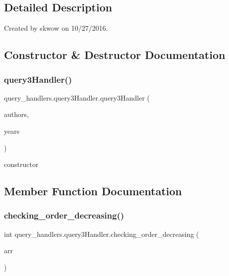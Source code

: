 \subsection{Detailed Description}
Created by skwow on 10/27/2016. 

\subsection{Constructor \& Destructor Documentation}
\hypertarget{classquery__handlers_1_1query3_handler_a211f4f1f6cab6c6f5e8b6d94efea78d7}{}\label{classquery__handlers_1_1query3_handler_a211f4f1f6cab6c6f5e8b6d94efea78d7} 
\subsubsection{\texorpdfstring{query3\+Handler()}{query3Handler()}}
{\footnotesize\ttfamily query\+\_\+handlers.\+query3\+Handler.\+query3\+Handler (\begin{DoxyParamCaption}\item[{String \mbox{[}$\,$\mbox{]}}]{authors,  }\item[{int \mbox{[}$\,$\mbox{]}}]{years }\end{DoxyParamCaption})}



constructor 



\subsection{Member Function Documentation}
\hypertarget{classquery__handlers_1_1query3_handler_a834ed632eac8da778268712379dc9276}{}\label{classquery__handlers_1_1query3_handler_a834ed632eac8da778268712379dc9276} 
\subsubsection{\texorpdfstring{checking\+\_\+order\+\_\+decreasing()}{checking\_order\_decreasing()}}
{\footnotesize\ttfamily int query\+\_\+handlers.\+query3\+Handler.\+checking\+\_\+order\+\_\+decreasing (\begin{DoxyParamCaption}\item[{Array\+List$<$ Integer $>$}]{arr }\end{DoxyParamCaption})}

